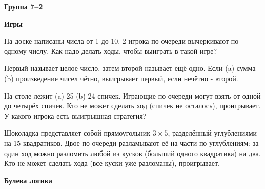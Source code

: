 \documentclass{article}
\begin{document}
    \large

    \begin{center}
        \textbf{Группа 7--2}
    \end{center}

    \begin{center}
        \textbf{Игры}
    \end{center}

    \begin{enumerate_boxed}

        \item На доске написаны числа от 1 до 10.
        2 игрока по очереди вычеркивают по одному числу.
        Как надо делать ходы, чтобы выиграть в такой игре?

        \item Первый называет целое число, затем второй называет ещё одно.
        Если (a) сумма (b) произведение чисел чётно, выигрывает первый, если нечётно - второй.

        \item На столе лежит (a) 25 (b) 24 спичек.
        Играющие по очереди могут взять от одной до четырёх спичек.
        Кто не может сделать ход (спичек не осталось), проигрывает.
        У какого игрока есть выигрышная стратегия?

        \item Шоколадка представляет собой прямоугольник $3 \times 5$, разделённый углублениями на 15 квадратиков.
        Двое по очереди разламывают её на части по углублениям: за один ход можно разломить любой из кусков (больший одного квадратика) на два.
        Кто не может сделать хода (все куски уже разломаны), проигрывает.

    \end{enumerate_boxed}

    \begin{center}
        \textbf{Булева логика}
    \end{center}
\end{document}
